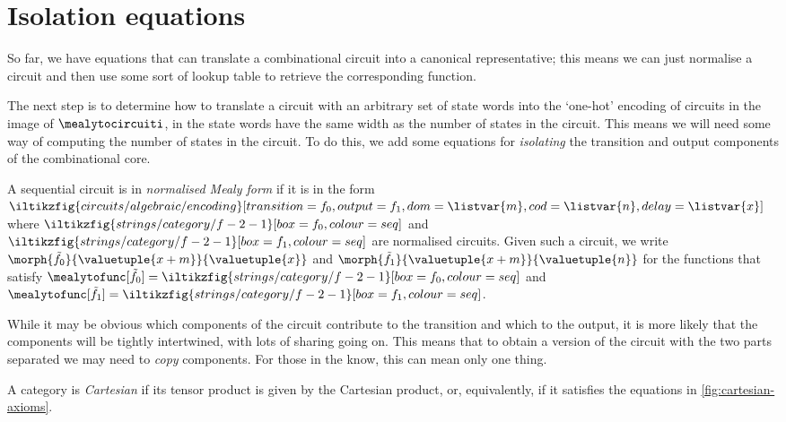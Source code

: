 \section{Isolation equations}

So far, we have equations that can translate a combinational circuit into a
canonical representative; this means we can just normalise a circuit and then
use some sort of lookup table to retrieve the corresponding function.

The next step is to determine how to translate a circuit with an arbitrary
set of state words into the `one-hot' encoding of circuits in the image of
\(\mealytocircuiti\), in the state words have the same width as the number of
states in the circuit.
This means we will need some way of computing the number of states in the
circuit.
To do this, we add some equations for \emph{isolating} the transition and output
components of the combinational core.

\begin{definition}
    A sequential circuit is in \emph{normalised Mealy form} if it is in the form
    \(
    \iltikzfig{circuits/algebraic/encoding}[transition={f_0},output={f_1},dom=\listvar{m},cod=\listvar{n},delay=\listvar{x}]
    \) where \(
    \iltikzfig{strings/category/f-2-1}[box=f_0,colour=seq]
    \) and \(
    \iltikzfig{strings/category/f-2-1}[box=f_1,colour=seq]
    \) are normalised circuits.
    Given such a circuit, we write \(
    \morph{\tilde{f}_{0}}{\valuetuple{x+m}}{{\valuetuple{x}}}
    \) and \(
    \morph{\tilde{f}_{1}}{\valuetuple{x+m}}{{\valuetuple{n}}}
    \) for the functions that satisfy \(
    \mealytofunc[\tilde{f}_{0}] = \iltikzfig{strings/category/f-2-1}[box=f_0,colour=seq]
    \) and \(
    \mealytofunc[\tilde{f}_{1}] = \iltikzfig{strings/category/f-2-1}[box=f_1,colour=seq]
    \).
\end{definition}

While it may be obvious which components of the circuit contribute to the
transition and which to the output, it is more likely that the components will
be tightly intertwined, with lots of sharing going on.
This means that to obtain a version of the circuit with the two parts separated
we may need to \emph{copy} components.
For those in the know, this can mean only one thing.

\begin{definition}
    A category is \emph{Cartesian} if its tensor product is given by the Cartesian
    product, or, equivalently, if it satisfies the equations in
    \cref{fig:cartesian-axioms}.
\end{definition}

